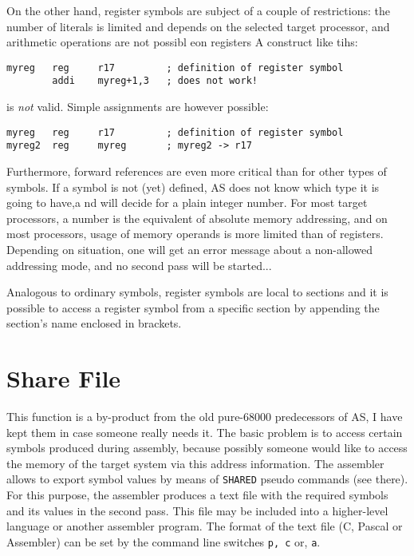 \documentclass[12pt,twoside]{report}
\makeatletter
\newcommand{\tty}[1]{{\tt #1}}
\newcommand{\ttindex}[1]{\index{#1@{\tt #1}}}
\newcommand{\asname}{{AS}}
\makeatother
\begin{document}
On the other hand, register symbols are subject of a couple of restrictions: the
number of literals is limited and depends on the selected target processor, and
arithmetic operations are not possibl eon registers A construct like tihs:
\begin{verbatim}
myreg   reg     r17         ; definition of register symbol
        addi    myreg+1,3   ; does not work!
\end{verbatim}
is {\em not} valid.  Simple assignments are however possible:
\begin{verbatim}
myreg   reg     r17         ; definition of register symbol
myreg2  reg     myreg       ; myreg2 -> r17
\end{verbatim}
Furthermore, forward references are even more critical than for other
types of symbols.  If a symbol is not (yet) defined, \asname{} does not know
which type it is going to have,a nd will decide for a plain integer number.
For most target processors, a number is the equivalent of absolute
memory addressing, and on most processors, usage of memory operands
is more limited than of registers.  Depending on situation, one will
get an error message about a non-allowed addressing mode, and no second
pass will be started...

Analogous to ordinary symbols, register symbols are local to sections and
it is possible to access a register symbol from a specific section by
appending the section's name enclosed in brackets.


\section{Share File}
\label{ChapShareMain}
\ttindex{SHARED}

This function is a by-product from the old pure-68000 predecessors of
\asname{}, I have kept them in case someone really needs it.  The basic
problem is to access certain symbols produced during assembly,
because possibly someone would like to access the memory of the
target system via this address information.  The assembler allows to
export symbol values by means of \tty{SHARED} pseudo commands (see there).
For this purpose, the assembler produces a text file with the required
symbols and its values in the second pass.  This file may be included
into a higher-level language or another assembler program.  The
format of the text file (C, Pascal or Assembler) can be set by the
command line switches \tty{p, c} or, \tty{a}.
\end{document}
